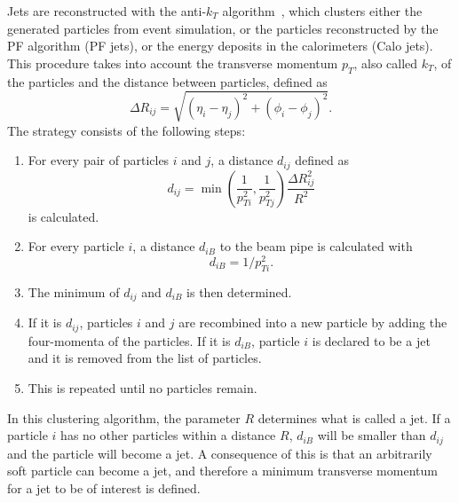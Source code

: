 Jets are reconstructed with the anti-$k_T$ algorithm~\cite{1126-6708-2008-04-063}, which clusters either the generated particles from event simulation, or the particles reconstructed by the \ac{PF} algorithm (\ac{PF} jets), or the energy deposits in the calorimeters (Calo jets). This procedure takes into account the transverse momentum $p_T$, also called $k_T$, of the particles and the distance between particles, defined as \begin{equation}                                                                                                                                                                                                                                                                                                     
 \Delta R_{ij} = \sqrt{(\eta_i - \eta_j)^2 + (\phi_i - \phi_j)^2}.                                                                                                                                                                                                                                                                                        \end{equation}
The strategy consists of the following steps:
\begin{enumerate}
 \item For every pair of particles $i$ and $j$, a distance $d_{ij}$ defined as 
 \begin{equation}
  d_{ij} = \min\left(\frac{1}{p_{Ti}^2}, \frac{1}{p_{Tj}^2} \right)\frac{\Delta R_{ij}^2}{R^2}
 \end{equation}
 is calculated.
 \item For every particle $i$, a distance $d_{iB}$ to the beam pipe is calculated with
 \begin{equation}
  d_{iB} = 1/p_{Ti}^{2}.
 \end{equation}
 \item The minimum of $d_{ij}$ and $d_{iB}$ is then determined.
 \item If it is $d_{ij}$, particles $i$ and $j$ are recombined into a new particle by adding the four-momenta of the particles. If it is $d_{iB}$, particle $i$ is declared to be a jet and it is removed from the list of particles.
 \item This is repeated until no particles remain.
\end{enumerate}

In this clustering algorithm, the parameter $R$ determines what is called a jet. If a particle $i$ has no other particles within a distance $R$, $d_{iB}$ will be smaller than $d_{ij}$ and the particle will become a jet. A consequence of this is that an arbitrarily soft particle can become a jet, and therefore a minimum transverse momentum for a jet to be of interest is defined.

